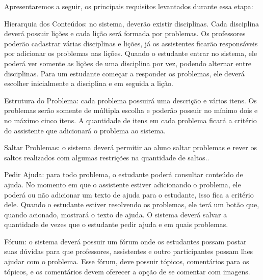 Apresentaremos a seguir, os principais requisitos levantados durante essa etapa:

\begin{alineascomponto}
	\item Hierarquia dos Conteúdos: no sistema, dever\~ao existir disciplinas. Cada disciplina dever\'a possuir li\c{c}\~oes e cada li\c{c}\~ao ser\'a formada por problemas. Os professores poder\~ao 
cadastrar v\'arias disciplinas e li\c{c}\~oes, j\'a os assistentes ficar\~ao responsáveis por adicionar os problemas nas li\c{c}\~oes. Quando o estudante entrar no sistema, ele poder\'a ver somente 
as li\c{c}\~oes de uma disciplina por vez, podendo alternar entre disciplinas. Para um estudante come\c{c}ar a responder os problemas, ele dever\'a escolher inicialmente a disciplina e em seguida a 
li\c{c}\~ao. 

	\item Estrutura do Problema: cada problema possuir\'a uma descri\c{c}\~ao e v\'arios itens. Os problemas ser\~ao somente de m\'ultipla escolha e poder\~ao possuir no m\'inimo dois e no m\'aximo 
cinco itens. A quantidade de itens em cada problema ficar\'a a crit\'erio do assistente que adicionar\'a o problema ao sistema.

	\item Saltar Problemas: o sistema deverá permitir ao aluno saltar problemas e rever os saltos 
realizados com algumas restrições na quantidade de saltos..
	
	\item Pedir Ajuda: para todo problema, o estudante poderá consultar conte\'udo de ajuda. No momento em que o assistente estiver adicionando o problema, ele poderá ou não adicionar um texto de 
ajuda para o estudante, isso fica a critério dele. Quando o estudante estiver resolvendo os problemas, ele terá um botão que, quando acionado, mostrar\'a o texto de ajuda. O sistema dever\'a salvar a 
quantidade 
de vezes que o estudante pedir ajuda e em quais problemas.
	\item F\'orum: o sistema deverá possuir um fórum onde os estudantes possam postar suas dúvidas para que professores, assistentes e outro participantes possam lhes ajudar com o problema. Esse fórum, deve possuir tópicos, comentários para os tópicos, e os comentários devem oferecer a opção de se comentar com imagens.     

\end{alineascomponto}

